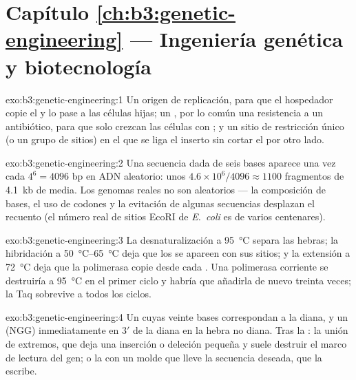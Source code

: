 \section*{Capítulo \ref{ch:b3:genetic-engineering} --- Ingeniería genética y biotecnología}

\begin{solution}{exo:b3:genetic-engineering:1}
Un origen de replicación, para que el hospedador copie el  y lo
pase a las células hijas; un , por lo común una
resistencia a un antibiótico, para que solo crezcan las células con
; y un sitio de restricción único (o un grupo de sitios) en el
que se liga el inserto sin cortar el  por otro lado.
\end{solution}

\begin{solution}{exo:b3:genetic-engineering:2}
Una secuencia dada de seis bases aparece una vez cada $4^{6} = 4096$ bp
en ADN aleatorio: unos $4.6\times 10^{6}/4096 \approx 1100$ fragmentos de
\qty{4.1}{kb} de media. Los genomas reales no son aleatorios --- la
composición de bases, el uso de codones y la evitación de algunas
secuencias desplazan el recuento (el número real de sitios EcoRI de
\emph{E.~coli} es de varios centenares).
\end{solution}

\begin{solution}{exo:b3:genetic-engineering:3}
La desnaturalización a \qty{95}{\celsius} separa las hebras; la
hibridación a \qtyrange{50}{65}{\celsius} deja que los  se
apareen con sus sitios; y la extensión a \qty{72}{\celsius} deja que la
polimerasa copie desde cada . Una polimerasa corriente se
destruiría a \qty{95}{\celsius} en el primer ciclo y habría que añadirla
de nuevo treinta veces; la Taq sobrevive a todos los ciclos.
\end{solution}

\begin{solution}{exo:b3:genetic-engineering:4}
Un  cuyas veinte bases correspondan a la diana, y un  (NGG)
inmediatamente en 3$'$ de la diana en la hebra no diana. Tras la : la unión de extremos, que deja una inserción o deleción
pequeña y suele destruir el marco de lectura del gen; o la  con un molde que lleve la secuencia deseada, que la escribe.
\end{solution}

